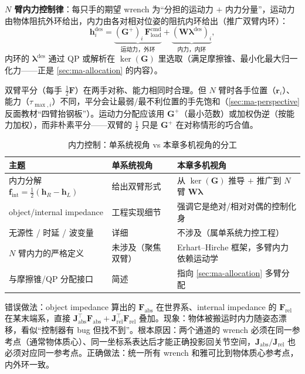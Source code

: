 \textbf{$N$ 臂内力控制律}：每只手的期望 wrench 为“分担的运动力 $+$ 内力分量”，运动力由物体阻抗外环给出，内力由各对相对位姿的阻抗内环给出（推广双臂内环）：
\begin{equation}
  \mathbf{h}_i^{\text{des}}=\underbrace{(\mathbf{G}^{+})_i\,\mathbf{F}_{\text{load}}^{\text{cmd}}}_{\text{运动力，外环}}+\underbrace{(\mathbf{W}\boldsymbol{\lambda}^{\text{des}})_i}_{\text{内力，内环}},
  \label{eq:ma-narm-ctrl}
\end{equation}
内环的 $\boldsymbol{\lambda}^{\text{des}}$ 通过 QP 或解析在 $\ker(\mathbf{G})$ 里选取（满足摩擦锥、最小化最大归一化力——正是 \cref{sec:ma-allocation} 的内容）。

\begin{insight}
双臂平分（每手 $\tfrac12\mathbf{F}$）在两手对称、能力相同时合理。但 $N$ 臂时各手位置（$\mathbf{r}_i$）、能力（$\tau_{\max,i}$）不同，平分会让最弱/最不利位置的手先饱和（\cref{sec:ma-perspective} 反面教材“四臂抬钢板”）。运动力分配应该用 $\mathbf{G}^{+}$（最小范数）或加权伪逆（按能力加权），而非朴素平分——双臂的 $\tfrac12$ 只是 $\mathbf{G}^{+}$ 在对称情形的巧合值。
\end{insight}

\begin{table}[H]\centering\small
\caption{内力控制：单系统视角 vs 本章多机视角的分工}
\label{tab:ma-force-division}
\begin{tabular}{p{3.4cm}p{5.0cm}p{5.0cm}}
\toprule
主题 & 单系统视角 & 本章多机视角 \\
\midrule
内力分解 $\mathbf{f}_{\text{int}}=\tfrac12(\mathbf{h}_R-\mathbf{h}_L)$ & 给出双臂形式 & 从 $\ker(\mathbf{G})$ 推导 $+$ 推广到 $N$ 臂 $\mathbf{W}\boldsymbol{\lambda}$ \\
object/internal impedance & 工程实现细节 & 强调它是绝对/相对对偶的控制化身 \\
无源性 / 时延 / 波变量 & 详细 & 不涉及（属单系统力控工程） \\
$N$ 臂内力的严格定义 & 未涉及（聚焦双臂） & Erhart--Hirche 框架，多臂内力依赖运动学 \\
与摩擦锥/QP 分配接口 & 简述 & 指向 \cref{sec:ma-allocation} 多臂分配 \\
\bottomrule
\end{tabular}
\end{table}

\begin{pitfall}
错误做法：object impedance 算出的 $\mathbf{F}_{\text{abs}}$ 在世界系、internal impedance 的 $\mathbf{F}_{\text{rel}}$ 在某末端系，直接 $\mathbf{J}_{\text{abs}}^\top\mathbf{F}_{\text{abs}}+\mathbf{J}_{\text{rel}}^\top\mathbf{F}_{\text{rel}}$ 叠加。现象：物体被搬运时内力随姿态漂移，看似“控制器有 bug 但找不到”。根本原因：两个通道的 wrench 必须在同一参考点（通常物体质心）、同一坐标系表达后才能正确投影回关节空间，$\mathbf{J}_{\text{abs}}/\mathbf{J}_{\text{rel}}$ 也必须对应同一参考点。正确做法：统一所有 wrench 和雅可比到物体质心参考点，内外环一致。
\end{pitfall}

